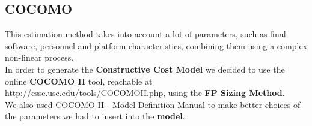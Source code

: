 \subsection{COCOMO}
This estimation method takes into account a lot of parameters, such as final software, personnel and platform characteristics, combining them using a complex non-linear process.\\
In order to generate the \textbf{Constructive Cost Model} we decided to use the online \textbf{COCOMO II} tool, reachable at \href{http://csse.usc.edu/tools/COCOMOII.php}{http://csse.usc.edu/tools/COCOMOII.php}, using the \textbf{FP Sizing Method}.\\
We also used \href{http://csse.usc.edu/csse/research/COCOMOII/cocomo2000.0/CII_modelman2000.0.pdf}{COCOMO II - Model Definition Manual} to make better choices of the parameters we had to insert into the \textbf{model}.\\
